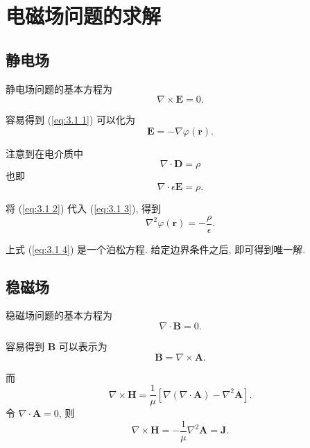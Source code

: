 \section{电磁场问题的求解}
\subsection{静电场}
静电场问题的基本方程为
\begin{equation} \label{eq:3.1 1}
    \nabla\times\bm{E}=0.
\end{equation}

容易得到 (\ref{eq:3.1 1}) 可以化为
\begin{equation} \label{eq:3.1 2}
    \bm{E}=-\nabla\varphi(\bm{r}).
\end{equation}

注意到在电介质中
\begin{equation}
    \nabla\cdot\bm{D}=\rho
\end{equation}
也即
\begin{equation} \label{eq:3.1 3}
    \nabla\cdot\epsilon\bm{E}=\rho.
\end{equation}

将 (\ref{eq:3.1 2}) 代入 (\ref{eq:3.1 3}), 得到
\begin{equation} \label{eq:3.1 4}
    \nabla^2\varphi(\bm{r})=-\frac{\rho}{\epsilon}.
\end{equation}

上式 (\ref{eq:3.1 4}) 是一个泊松方程. 给定边界条件之后, 即可得到唯一解.

\subsection{稳磁场}
稳磁场问题的基本方程为
\begin{equation}
    \nabla\cdot\bm{B}=0.
\end{equation}

容易得到 $\bm{B}$ 可以表示为
\begin{equation}
    \bm{B}=\nabla\times\bm{A}.
\end{equation}

而
\begin{equation}
    \nabla\times\bm{H}=\frac{1}{\mu}[\nabla(\nabla\cdot\bm{A})-\nabla^2\bm{A}].
\end{equation}
令 $\nabla\cdot\bm{A}=0$, 则
\begin{equation}
    \nabla\times\bm{H}=-\frac{1}{\mu}\nabla^2\bm{A}=\bm{J}.
\end{equation}

